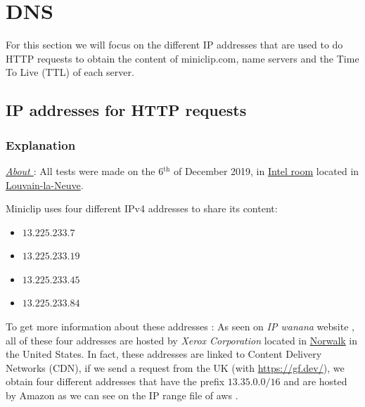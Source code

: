 \documentclass{article}
\begin{document}
\section{DNS}
\label{sec:DNS}


For this section we will focus on the different IP addresses that are used to do HTTP requests to obtain the content of miniclip.com, name servers and the Time To Live (TTL) of each server.

\subsection{IP addresses for HTTP requests}

\subsubsection{Explanation}
\label{subsub:ipexp}

\textit{\underline{About }}: All tests were made on the 6$^{\text{th}}$ of December 2019, in \href{https://goo.gl/maps/o6d29MMUkajAf4NXA}{Intel room} located in \href{https://goo.gl/maps/o6d29MMUkajAf4NXA}{Louvain-la-Neuve}.

\vspace{0.5cm}

Miniclip uses four different IPv4 addresses to share its content: 
\begin{itemize}
    \itemsep-0.1em 
    \item $13.225.233.7$
    \item $13.225.233.19$
    \item $13.225.233.45$
    \item $13.225.233.84$
\end{itemize}

To get more information about these addresses : As seen on \textit{IP wanana} website \cite{ip}, all of these four addresses are hosted by \textit{Xerox Corporation} located in \href{https://goo.gl/maps/ArqaLQaFP1qYbP2j8}{Norwalk} in the United States. In fact, these addresses are linked to Content Delivery Networks (CDN), if we send a request from the UK (with \url{https://gf.dev/}), we obtain four different addresses that have the prefix $13.35.0.0/16$ and are hosted by Amazon as we can see on the IP range file of aws \cite{awsrange}. 
\end{document}
